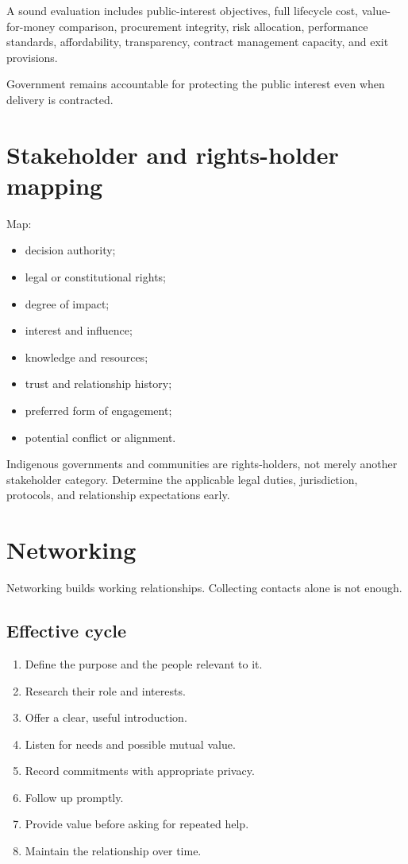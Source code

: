 \documentclass[11pt,letterpaper,oneside,openany]{book}
\begin{document}
A sound evaluation includes public-interest objectives, full lifecycle cost, value-for-money comparison, procurement integrity, risk allocation, performance standards, affordability, transparency, contract management capacity, and exit provisions.


Government remains accountable for protecting the public interest even when delivery is contracted.


\section[Stakeholder and rights-holder mapping]{Stakeholder and rights-holder mapping}
Map:


\begin{itemize}
\item decision authority;
\item legal or constitutional rights;
\item degree of impact;
\item interest and influence;
\item knowledge and resources;
\item trust and relationship history;
\item preferred form of engagement;
\item potential conflict or alignment.
\end{itemize}


Indigenous governments and communities are rights-holders, not merely another stakeholder category. Determine the applicable legal duties, jurisdiction, protocols, and relationship expectations early.


\section[Networking]{Networking}
Networking builds working relationships. Collecting contacts alone is not enough.


\subsection[Effective cycle]{Effective cycle}
\begin{enumerate}
\item Define the purpose and the people relevant to it.
\item Research their role and interests.
\item Offer a clear, useful introduction.
\item Listen for needs and possible mutual value.
\item Record commitments with appropriate privacy.
\item Follow up promptly.
\item Provide value before asking for repeated help.
\item Maintain the relationship over time.
\end{enumerate}
\end{document}

